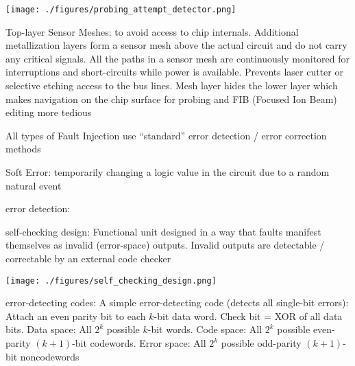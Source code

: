 \documentclass[landscape, a4paper]{article}
\begin{document}
\begin{minipage}[t]{0.2\linewidth}
\begin{betterlist}
\begin{betterlist}
			\texttt{[image: ./figures/probing\_attempt\_detector.png]}
			\item \alert{Top-layer Sensor Meshes:} to avoid access to chip internals. Additional metallization layers form a sensor mesh above the actual circuit and do not carry any critical signals. All the paths in a sensor mesh are continuously monitored for interruptions and short-circuits while power is available. Prevents laser cutter or selective etching access to the bus lines. Mesh layer hides the lower layer which makes navigation on the chip surface for probing and FIB (Focused Ion Beam) editing more tedious
		\end{betterlist}
		\item \alert{All types of Fault Injection} use \enquote{standard} error detection / error correction methods
		\begin{betterlist}
			\item \alert{Soft Error:} temporarily changing a logic value in the circuit due to a random natural event
			\item \alert{error detection:}
			\begin{betterlist}
				\item \alert{self-checking design:} Functional unit designed in a way that faults manifest themselves as invalid (error-space) outputs. Invalid outputs are detectable / correctable by an external code checker

				\texttt{[image: ./figures/self\_checking\_design.png]}
				\item \alert{error-detecting codes:}  A simple error-detecting code (detects all single-bit errors): Attach an even parity bit to each $k$-bit data word. Check bit = XOR of all data bits. \alert{Data space:} All $2^k$ possible $k$-bit words. \alert{Code space:} All $2^k$ possible even-parity $(k + 1)$-bit codewords. \alert{Error space:} All $2^k$ possible odd-parity $(k + 1)$-bit noncodewords


\end{betterlist}
\end{betterlist}
\end{betterlist}
\end{minipage}
\end{document}
